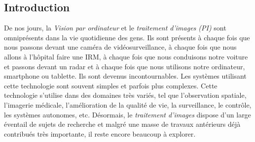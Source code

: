 \subsection*{Introduction}


De nos jours, la \emph{Vision par ordinateur} et le \emph{traitement d'images (PI)} sont omniprésents dans la vie
quotidienne des gens. Ils sont présents à chaque fois que nous passons devant une caméra de vidéosurveillance, à chaque
fois que nous allons à l'hôpital faire une IRM, à chaque fois que nous conduisons notre voiture et passons devant un
radar et à chaque fois que nous utilisons notre ordinateur, smartphone ou tablette. Ils sont devenus incontournables.
Les systèmes utilisant cette technologie sont souvent simples et parfois plus complexes. Cette technologie s'utilise
dans des domaines très variés, tel que l'observation spatiale, l'imagerie médicale, l'amélioration de la qualité de vie,
la surveillance, le contrôle, les systèmes autonomes, etc. Désormais, le \emph{traitement d'images} dispose d'un large
éventail de sujets de recherche et malgré une masse de travaux antérieurs déjà contribués très importante, il reste
encore beaucoup à explorer.

